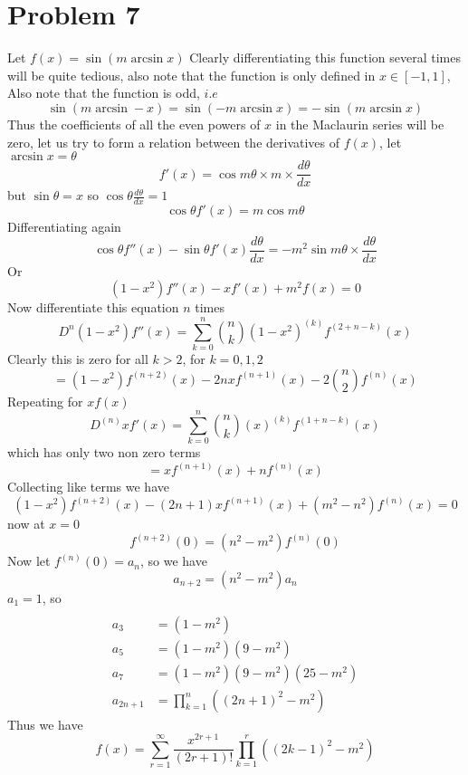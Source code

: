 \documentclass[12pt]{article}
\begin{document}
\section*{Problem 7}
Let $f(x) = \sin(m \arcsin x)$
Clearly differentiating this function several times will be quite tedious, also note that the function is only defined in $x \in [-1,1]$, Also note that the function is odd, $i$.$e$ 
$$
\sin(m \arcsin -x) = \sin(-m \arcsin x) = -\sin (m \arcsin x)
$$
Thus the coefficients of all the even powers of $x$ in the Maclaurin series will be zero, let us try to form a relation between the derivatives of $f(x)$, let $\arcsin x  =\theta$
$$
f'(x) = \cos m\theta \times m\times \frac{d\theta}{dx}
$$
but $\sin \theta  = x$ so $\cos \theta \frac{ d\theta}{dx} = 1$
$$
\cos \theta f'(x) = m\cos m\theta
$$
Differentiating again
$$
\cos \theta f''(x) -\sin \theta f'(x) \frac{d\theta}{dx} = -m^{2}\sin m\theta  \times \frac{d\theta}{dx}
$$
Or
$$
(1-x^{2})f''(x)-xf'(x)+ m^{2}f(x) = 0
$$
Now differentiate this equation $n$ times
$$
D^{n}(1-x^{2})f''(x) = \sum_{k=0}^{n} \binom{n}{k} (1-x^{2})^{(k)} f^{(2 + n-k)}(x)
$$
Clearly this is zero for all $k>2$, for $k=0,1,2$
$$
= (1-x^{2})f^{(n+2)}(x) -2nxf^{(n+1)}(x) -2\binom{n}{2} f^{(n)}(x)
$$
Repeating for $xf(x)$
$$
D^{(n)}xf'(x)= \sum_{k=0}^{n} \binom{n}{k} (x)^{(k)} f^{(1 + n-k)}(x)
$$
which has only two non zero terms
$$
=xf^{(n+1)}(x) + nf^{(n)}(x)
$$
Collecting like terms we have
$$
(1-x^{2})f^{(n+2)}(x) - (2n+1)xf^{(n+1)}(x) + (m^{2}-n^{2})f^{(n)}(x) = 0
$$
now at $x=0$
$$
f^{(n+2)}(0) = (n^{2}-m^{2}) f^{(n)} (0)
$$
Now let $f^{(n)}(0) = a_{n}$, so we have
$$
a_{n+2} = ( n^{2} -m^{2} ) a_{n}
$$
$a_{1}= 1$, so
$$
\begin{align} \\
a_{3}  & =(1-m^{2}) \\
a_{5}  & = (1-m^{2})(9-m^{2}) \\
a_{7}  & = (1-m^{2})(9-m^{2})(25-m^{2}) \\
a_{2n+1} & = \prod_{k=1}^{n} ((2n+1)^{2} -m^{2})
\end{align}
$$
Thus we have
$$
f(x) = \sum_{r=1}^{\infty} \frac{x^{2r+1}}{(2r+1)!} \prod_{k=1}^{r} ((2k-1)^{2} -m^{2})
$$
\end{document}
